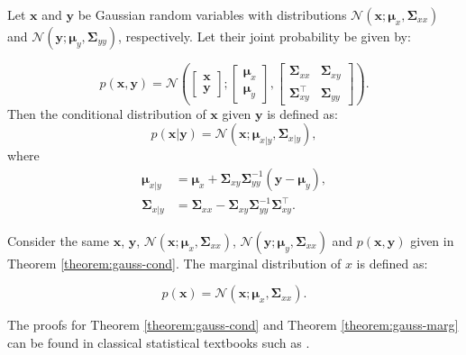 \begin{theorem}\label{theorem:gauss-cond}
    Let $\mathbf{x}$ and $\mathbf{y}$ be Gaussian random variables with distributions $\mathscr{N}\left(\mathbf{x} ; \mathbf\mu_x, \mathbf\Sigma_{xx}\right)$ and $\mathscr{N}\left(\mathbf{y} ; \mathbf\mu_y, \mathbf\Sigma_{yy}\right)$, respectively. Let their joint probability be given by:

    \begin{equation}
        p(\mathbf{x}, \mathbf{y}) = \mathscr{N}\left(
            \begin{bmatrix}
                \mathbf{x} \\
                \mathbf{y}
            \end{bmatrix};
            \begin{bmatrix}
                \boldsymbol\mu_x \\
                \boldsymbol\mu_y
            \end{bmatrix},
            \begin{bmatrix}
                \mathbf{\Sigma}_{xx} & \mathbf{\Sigma}_{xy} \\
                \mathbf{\Sigma}_{xy}^\intercal & \mathbf{\Sigma}_{yy}
            \end{bmatrix}
        \right).
    \end{equation}
    \noindent Then the conditional distribution of $\mathbf{x}$ given $\mathbf{y}$ is defined as:
    \begin{equation}\label{eq:gauss-cond}
        p(\mathbf{x}|\mathbf{y}) =
        \mathscr{N}\left(\mathbf{x}; \boldsymbol\mu_{x|y}, \mathbf\Sigma_{x|y}\right),
    \end{equation}
    \noindent where
    \begin{align}
        \boldsymbol\mu_{x|y}
        &= \boldsymbol\mu_x + \mathbf{\Sigma}_{xy} \mathbf{\Sigma}_{yy}^{-1}(\mathbf{y} - \boldsymbol\mu_y), \\
        \mathbf\Sigma_{x|y} 
        &= \mathbf\Sigma_{xx} - \mathbf\Sigma_{xy}\mathbf\Sigma_{yy}^{-1}\mathbf\Sigma_{xy}^\intercal.\label{eq:gauss-cond-params}
    \end{align}
\end{theorem}

\begin{theorem}\label{theorem:gauss-marg}
    Consider the same $\mathbf{x}$, $\mathbf{y}$, $\mathscr{N}\left(\mathbf{x} ; \mathbf\mu_x, \mathbf\Sigma_{xx}\right)$, $\mathscr{N}\left(\mathbf{y} ; \mathbf\mu_y, \mathbf\Sigma_{xx}\right)$ and $p(\mathbf{x}, \mathbf{y})$ given in Theorem \ref{theorem:gauss-cond}. The marginal distribution of $x$ is defined as:

    \begin{equation}
        p(\mathbf{x}) = \mathscr{N}\left(\mathbf{x} ; \mathbf\mu_x, \mathbf\Sigma_{xx}\right).
    \end{equation}
\end{theorem}

The proofs for Theorem \ref{theorem:gauss-cond} and Theorem \ref{theorem:gauss-marg} can be found in classical statistical textbooks such as \cite[161--163]{johnsonAppliedMultivariateStatistical2007}.
